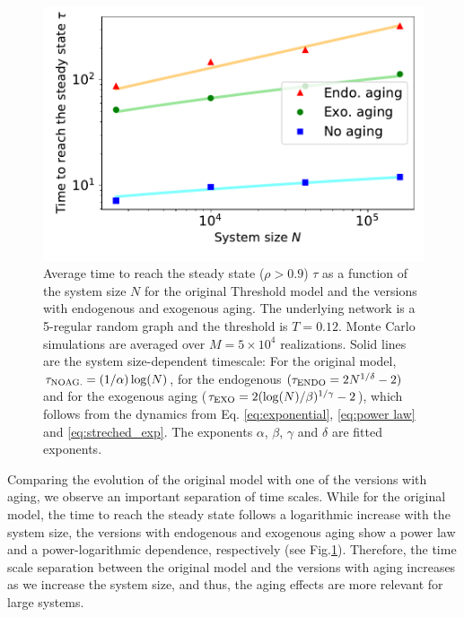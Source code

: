 \begin{figure}
\includegraphics[width=0.95\columnwidth]{Figs/Aging_Threshold/time_steady.pdf}
\caption{\label{fig:time_steady} Average time to reach the steady state ($\rho > 0.9$) $\tau$ as a function of the system size $N$ for the original Threshold model and the versions with endogenous and exogenous aging. The underlying network is a 5-regular random graph and the threshold is $T = 0.12$. Monte Carlo simulations are averaged over $M = 5 \times 10^4$ realizations. Solid lines are the system size-dependent timescale: For the original model, $\tau_{\rm{NO AG.}} = (1/\alpha)\log(N)$, for the endogenous $(\tau_{\rm{ENDO}} = 2N^{1/\delta} - 2)$ and for the exogenous aging ($\tau_{\rm{EXO}} = 2(\log(N)/\beta)^{1/\gamma} - 2$), which follows from the dynamics from Eq. \eqref{eq:exponential}, \eqref{eq:power law} and \eqref{eq:streched_exp}. The exponents $\alpha$, $\beta$, $\gamma$ and $\delta$ are fitted exponents.}
\end{figure}

Comparing the evolution of the original model with one of the versions with aging, we observe an important separation of time scales. While for the original model, the time to reach the steady state follows a logarithmic increase with the system size, the versions with endogenous and exogenous aging show a power law and a power-logarithmic dependence, respectively (see Fig.\ref{fig:time_steady}). Therefore, the time scale separation between the original model and the versions with aging increases as we increase the system size, and thus, the aging effects are more relevant for large systems.


